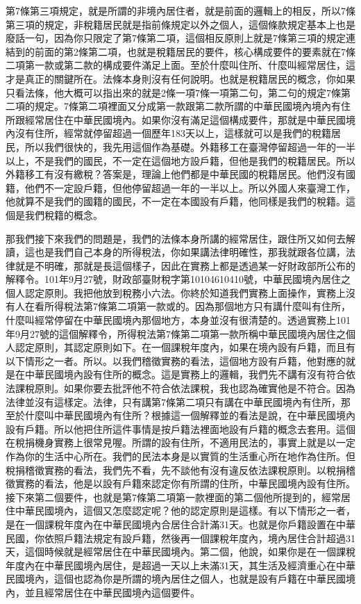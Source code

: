 \documentclass[]{ctexbook}
\begin{document}
第7條第三項規定，就是所謂的非境內居住者，就是前面的邏輯上的相反，所以7條第三項的規定，非稅籍居民就是指前條規定以外之個人，這個條款規定基本上也是廢話一句，因為你只限定了第7條第二項，這個相反原則上就是7條第三項的規定連結到的前面的第2條第二項，也就是稅籍居民的要件，核心構成要件的要素就在7條二項第一款或第二款的構成要件滿足上面。至於什麼叫住所、什麼叫經常居住，這才是真正的關鍵所在。法條本身則沒有任何說明。也就是稅籍居民的概念，你如果只看法條，他大概可以指出來的就是2條一項7條一項第二句，第二句的規定7條第二項的規定。7條第二項裡面又分成第一款跟第二款所謂的中華民國境內境內有住所跟經常居住在中華民國境內。如果你沒有滿足這個構成要件，那就是中華民國境內沒有住所，經常就停留超過一個歷年183天以上，這樣就可以是我們的稅籍居民，所以我們很快的，我先用這個作為基礎。外籍移工在臺灣停留超過一年的一半以上，不是我們的國民，不一定在這個地方設戶籍，但他是我們的稅籍居民。所以外籍移工有沒有繳稅？答案是，理論上他們都是中華民國的稅籍居民。他們沒有國籍，他們不一定設戶籍，但他停留超過一年的一半以上。所以外國人來臺灣工作，他就算不是我們的國籍的國民，不一定在本國設有戶籍，他同樣是我們的稅籍。這個是我們稅籍的概念。

那我們接下來我們的問題是，我們的法條本身所講的經常居住，跟住所又如何去解讀，這也是我們自己本身的所得稅法，你如果講法律明確性，那我就跟各位講，法律就是不明確，那就是長這個樣子，因此在實務上都是透過某一好財政部所公布的解釋令。101年9月27號，財政部臺財稅字第10104610410號，中華民國境內居住之個人認定原則。我把他放到稅務小六法。你終於知道我們實務上面操作，實務上沒有人在看所得稅法第7條第二項第一款或的。因為那個地方只有講什麼叫有住所，什麼叫經常停留在中華民國境內那個地方，本身並沒有很清楚的。透過實務上101年9月27號的這個解釋令，所得稅法第7條第二項第一款所稱中華民國境內居住之個人認定原則，其認定原則如下。在一個課稅年度內，如果在境內設有戶籍，而且有以下情形之一者。所以。以我們稽徵實務的看法，這個地方設有戶籍，他對應的就是在中華民國境內設有住所的概念。這是實務上的邏輯，我們先不講有沒有符合依法課稅原則。如果你要去批評他不符合依法課稅，我也認為確實他是不符合。因為法律並沒有這樣定。法律，只有講第7條第二項只有講在中華民國境內有住所，那至於什麼叫中華民國境內有住所？根據這一個解釋並的看法是說，在中華民國境內設有戶籍。所以他把住所這件事情是按戶籍法裡面地設有戶籍的概念去套用。這個在稅捐機身實務上很常見喔。所謂的設有住所，不適用民法的，事實上就是以一定作為你的生活中心所在。我們的民法本身是以實質的生活重心所在地作為住所。但稅捐稽徵實務的看法，我們先不看，先不談他有沒有違反依法課稅原則。以稅捐稽徵實務的看法，他是以設有戶籍來認定你有所謂的住所，中華民國境內設有住所。接下來第二個要件，也就是第7條第二項第一款裡面的第二個他所提到的，經常居住中華民國境內，這個又怎麼認定呢？他的認定原則是這樣。有以下情形之一者，是在一個課稅年度內在中華民國境內合居住合計滿31天。也就是你戶籍設置在中華民國，你依照戶籍法規定有設戶籍，然後再一個課稅年度內，境內居住合計超過31天，這個時候就是經常居住在中華民國境內。第二個，他說，如果你是在一個課稅年度內在中華民國境內居住，是超過一天以上未滿31天，其生活及經濟重心在中華民國境內，這個也認為你是所謂的境內居住之個人，也就是設有戶籍在中華民國境內，並且經常居住在中華民國境內這個要件。
\end{document}

